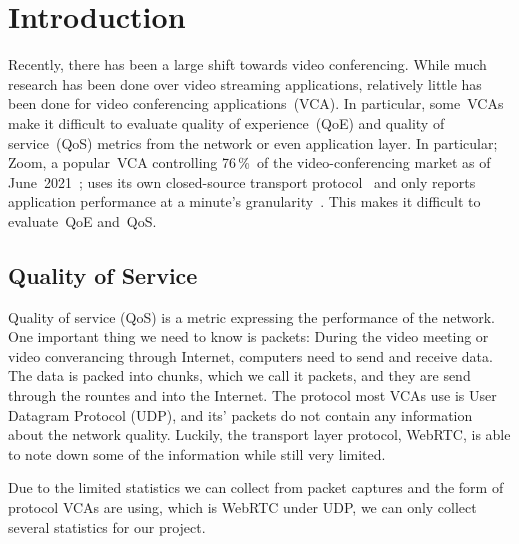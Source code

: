 \section{Introduction}\label{introduction}
    Recently, there has been a large shift towards video conferencing. While much research has been done over video streaming applications, relatively little has been done for video conferencing applications~(VCA). In particular, some~VCAs make it difficult to evaluate quality of experience~(QoE) and quality of service~(QoS) metrics from the network or even application layer. In particular; Zoom, a popular~VCA controlling 76\,\%~of the video-conferencing market as of June~2021~\autocite{kim2021}; uses its own closed-source transport protocol~\autocite{marczak2020} and only reports application performance at a minute's granularity~\autocite{walia2019}. This makes it difficult to evaluate~QoE and~QoS.

    \subsection{Quality of Service}\label{introduction:qos}
        Quality of service (QoS) is a metric expressing the performance of the network. One important thing we need to know is packets: During the video meeting or video converancing through Internet, computers need to send and receive data. The data is packed into chunks, which we call it packets, and they are send through the rountes and into the Internet. The protocol most VCAs use is User Datagram Protocol (UDP), and its' packets do not contain any information about the network quality. Luckily, the transport layer protocol, WebRTC, is able to note down some of the information while still very limited.
        
        Due to the limited statistics we can collect from packet captures and the form of protocol VCAs are using, which is WebRTC under UDP, we can only collect several statistics for our project. 

